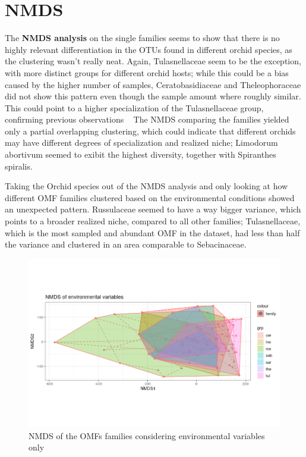 \chapter{NMDS}
\label{nmds}

The \textbf{NMDS analysis} on the single families seems to show that there is no highly relevant differentiation in the OTUs found in different orchid species, as the clustering wasn't really neat.
Again, Tulasnellaceae seem to be the exception, with more distinct groups for different orchid hosts; while this could be a bias caused by the higher number of samples, Ceratobasidiaceae and Theleophoraceae did not show this pattern even though the sample amount where roughly similar. This could point to a higher specialization of the Tulasnellaceae group, confirming previous observations ~\citep{dearnaley2007}
The NMDS comparing the families yielded only a partial overlapping clustering, which could indicate that different orchids may have different degrees of specialization and realized niche; Limodorum abortivum seemed to exibit the highest diversity, together with Spiranthes spiralis.

Taking the Orchid species out of the NMDS analysis and only looking at how different OMF families clustered based on the environmental conditions showed an unexpected pattern. Russulaceae seemed to have a way bigger variance, which points to a broader realized niche, compared to all other families; Tulasnellaceae, which is the most sampled and abundant OMF in the dataset, had less than half the variance and clustered in an area comparable to Sebacinaceae.

\begin{figure}[htbp]
\centering
\includegraphics[keepaspectratio,width=\textwidth,height=0.75\textheight]{images/nmdsEnvMatrix.png}
\caption{NMDS of the OMFs families considering environmental variables only}
\end{figure}


